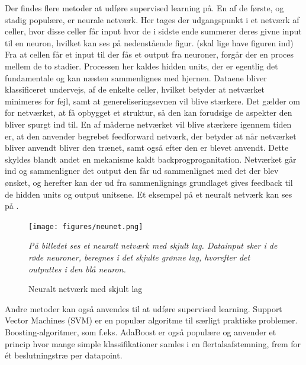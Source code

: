 Der findes flere metoder at udføre supervised learning på. En af de første, og stadig populære, er neurale netværk. Her tages der udgangspunkt i et netværk af celler, hvor disse celler får input hvor de i sidste ende summerer deres givne input til en neuron, hvilket kan ses på nedenstående figur. (skal lige have figuren ind)
Fra at cellen får et input til der fås et output fra neuroner, forgår der en proces mellem de to stadier. Processen her kaldes hidden units, der er egentlig det fundamentale og kan næsten sammenlignes med hjernen. Dataene bliver klassificeret undervejs, af de enkelte celler, hvilket betyder at netværket minimeres for fejl, samt at genereliseringsevnen vil blive stærkere. Det gælder om for netværket, at få opbygget et struktur, så den kan forudsige de aspekter den bliver spurgt ind til. \cite{DIKU2010} En af måderne netværket vil blive stærkere igennem tiden er, at den anvender begrebet feedforward netværk, der betyder at når netværket bliver anvendt bliver den trænet, samt også efter den er blevet anvendt. Dette skyldes blandt andet en mekanisme kaldt backprogproganitation. Netværket går ind og sammenligner det output den får ud sammenlignet med det der blev ønsket, og herefter kan der ud fra sammenlignings grundlaget gives feedback til de hidden units og output unitsene.  Et eksempel på et neuralt netværk kan ses på .

\begin{figure}[H]
	\centering
	\texttt{[image: figures/neunet.png]}
	\caption{Neuralt netværk med skjult lag}
	\label{dt}
	\textit{På billedet ses et neuralt netværk med skjult lag. Datainput sker i de røde neuroner, beregnes i det skjulte grønne lag, hvorefter det outputtes i den blå neuron.}
\end{figure}

Andre metoder kan også anvendes til at udføre supervised learning. Support Vector Machines (SVM) er en populær algoritme til særligt praktiske problemer. Boosting-algoritmer, som f.eks. AdaBoost er også populære og anvender et princip hvor mange simple klassifikationer samles i en flertalsafstemning, frem for ét beslutningstræ per datapoint.